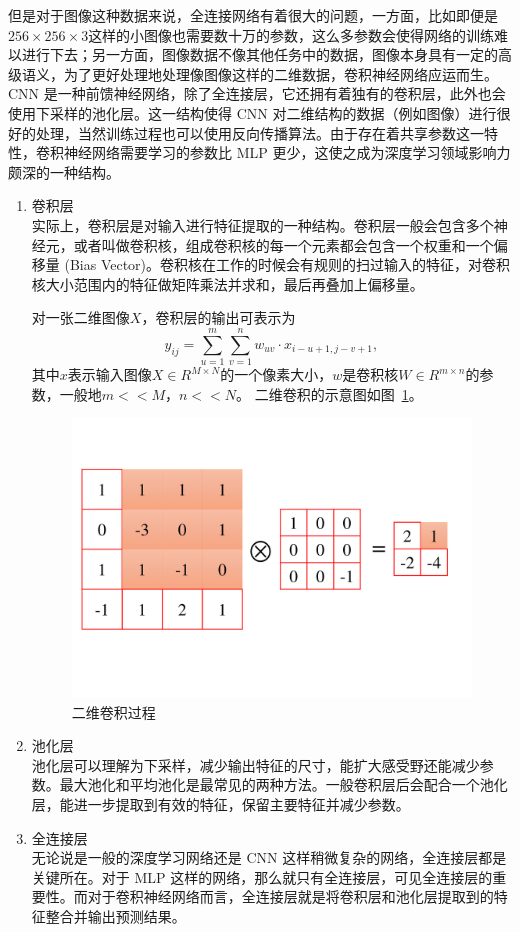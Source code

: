 但是对于图像这种数据来说，全连接网络有着很大的问题，一方面，比如即便是$256 \times 256 \times 3$这样的小图像也需要数十万的参数，这么多参数会使得网络的训练难以进行下去；另一方面，图像数据不像其他任务中的数据，图像本身具有一定的高级语义，为了更好处理地处理像图像这样的二维数据，卷积神经网络应运而生。CNN 是一种前馈神经网络，除了全连接层，它还拥有着独有的卷积层，此外也会使用下采样的池化层。这一结构使得 CNN 对二维结构的数据（例如图像）进行很好的处理，当然训练过程也可以使用反向传播算法\cite{rumelhart1986learning}。由于存在着共享参数这一特性，卷积神经网络需要学习的参数比 MLP 更少，这使之成为深度学习领域影响力颇深的一种结构。

\begin{enumerate}
    \item 卷积层　\\
    实际上，卷积层是对输入进行特征提取的一种结构。卷积层一般会包含多个神经元，或者叫做卷积核，组成卷积核的每一个元素都会包含一个权重和一个偏移量 (Bias Vector)。卷积核在工作的时候会有规则的扫过输入的特征，对卷积核大小范围内的特征做矩阵乘法并求和，最后再叠加上偏移量。
    
    对一张二维图像$X$，卷积层的输出可表示为
    \begin{equation}
        y_{ij} = \sum_{u=1}^{m}\sum_{v=1}^{n}w_{uv} \cdot x_{i-u+1,j-v+1},
    \end{equation}
    其中$x$表示输入图像$X\in{R^{M\times N}}$的一个像素大小，$w$是卷积核$W \in R^{m\times n}$的参数，一般地$m << M$，$n << N$。
    二维卷积的示意图如图~\ref{fig:2dconv}。
    \begin{figure}[htbp]
        \centering
        \includegraphics[width=0.7\linewidth]{figures/2dconv.pdf}
        \caption{二维卷积过程}
        \label{fig:2dconv}
    \end{figure}
    \item 池化层　\\
    池化层可以理解为下采样，减少输出特征的尺寸，能扩大感受野还能减少参数。最大池化和平均池化是最常见的两种方法。一般卷积层后会配合一个池化层，能进一步提取到有效的特征，保留主要特征并减少参数。
    \item 全连接层　\\
    无论说是一般的深度学习网络还是 CNN 这样稍微复杂的网络，全连接层都是关键所在。对于 MLP 这样的网络，那么就只有全连接层，可见全连接层的重要性。而对于卷积神经网络而言，全连接层就是将卷积层和池化层提取到的特征整合并输出预测结果。
\end{enumerate}


